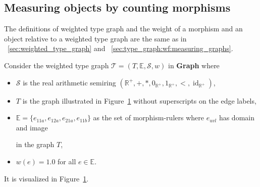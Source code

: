 \subsection{Measuring objects by counting morphisms}
The definitions of weighted type graph and the weight of a morphism and an object relative to a weighted type graph are the same as in \textsection~\ref{sec:weighted_type_graph} and \textsection~\ref{sec:type_graph:wf:measuring_graphs}.
\begin{example}
    \label{nwf:example:weighted_type_graph}
     Consider the weighted type graph $\mathcal{T} \mathop{=} (T, \mathbb{E}, \mathcal{S}, w)$ in \textbf{Graph} where
     \begin{itemize}
        \item $\mathcal{S}$ is the real arithmetic semiring $(\mathbb{R}^+, +, *, 0_{\mathbb{R}^+}, 1_{\mathbb{R}^+}, <, \operatorname{id}_{\mathbb{R}^+})$,
        \item $T$ is the graph illustrated in Figure~\ref{fig:nwf:weighted_type_graph_sss} without superscripts on the edge labels,
        \item $\mathbb{E}=\{e_{11a},e_{12a},e_{21a},e_{11b}\}$ as the set of morphism-rulers where 
     $e_{uvl}$ has domain 
      and image 
     in the graph $T$,
    \item $w(e) \mathop{=} 1.0$ for all $e \mathop{\in} \mathbb{E}$.
     \end{itemize} 
\noindent It is visualized in Figure~\ref{fig:nwf:weighted_type_graph_sss}.
    \begin{figure}[H] 
        \centering
        \caption{}
        \label{fig:nwf:weighted_type_graph_sss}
    \end{figure}


\end{example}
